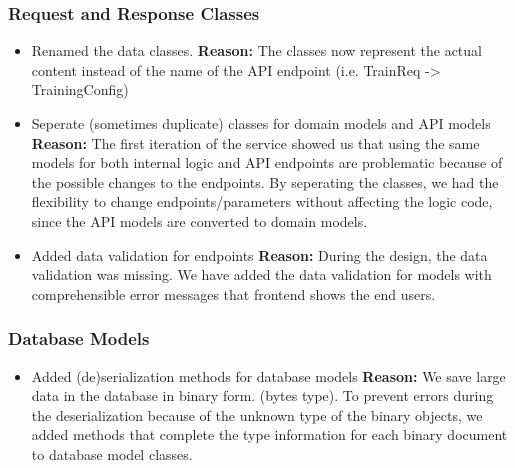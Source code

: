 \subsubsection{Request and Response Classes}
\begin{itemize}
    \item
    Renamed the data classes.
    \newline
    \textbf{Reason:} The classes now represent the actual content instead of the name
    of the API endpoint (i.e. TrainReq -> TrainingConfig)
    \item
    Seperate (sometimes duplicate) classes for domain models and API models
    \newline
    \textbf{Reason:} The first iteration of the service showed us that using the
    same models for both internal logic and API endpoints are problematic because
    of the possible changes to the endpoints. By seperating the classes, we had
    the flexibility to change endpoints/parameters without affecting the logic code,
    since the API models are converted to domain models.
    \item
    Added data validation for endpoints 
    \newline
    \textbf{Reason:} During the design, the data validation was missing. We have
    added the data validation for models with comprehensible error messages that
    frontend shows the end users.
\end{itemize}

\subsubsection{Database Models}
\begin{itemize}
    \item
    Added (de)serialization methods for database models
    \newline
    \textbf{Reason:} We save large data in the database in binary form. 
    (bytes type). To prevent errors during the deserialization because of the
    unknown type of the binary objects, we added methods that complete
    the type information for each binary document to database model classes.
\end{itemize}